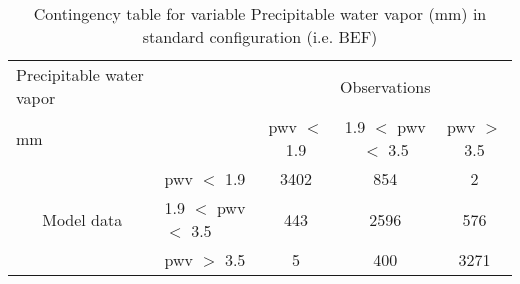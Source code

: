 \begin{table}[]
\begin{center}
\begin{tabular}{llccc}
\hline
{Precipitable water vapor}                                       &                                                    & \multicolumn{3}{c}{Observations}                 \\
{mm}                                       &                             & pwv $<$ 1.9   & 1.9 $<$ pwv $<$ 3.5 & pwv $>$ 3.5 \\
\hline
\multicolumn{1}{c}{\multirow{3}{*}{Model data}}  & pwv $<$ 1.9             & 3402                & 854                       & 2              \\
                                                 & 1.9  $<$ pwv $<$ 3.5 & 443                & 2596                       & 576              \\
                                                 & pwv $>$ 3.5             & 5                & 400                       & 3271              \\
\hline
\end{tabular}
\end{center}
\caption{Contingency table for variable Precipitable water vapor (mm) in standard configuration (i.e. BEF)}
\label{tab:contingencypwvBEF}
\end{table}
